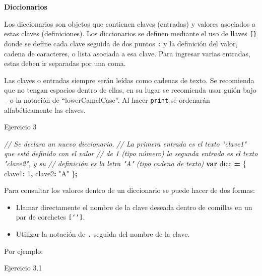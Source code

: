 \documentclass[
  12pt,
  letterpaper,
  twoside]{book}
\newenvironment{Shaded}{\begin{snugshade}}{\end{snugshade}}
\newcommand{\CommentTok}[1]{\textcolor[rgb]{0.56,0.35,0.01}{\textit{#1}}}
\newcommand{\DataTypeTok}[1]{\textcolor[rgb]{0.13,0.29,0.53}{#1}}
\newcommand{\DecValTok}[1]{\textcolor[rgb]{0.00,0.00,0.81}{#1}}
\newcommand{\KeywordTok}[1]{\textcolor[rgb]{0.13,0.29,0.53}{\textbf{#1}}}
\newcommand{\NormalTok}[1]{#1}
\newcommand{\OperatorTok}[1]{\textcolor[rgb]{0.81,0.36,0.00}{\textbf{#1}}}
\newcommand{\StringTok}[1]{\textcolor[rgb]{0.31,0.60,0.02}{#1}}
\providecommand{\tightlist}{%
  \setlength{\itemsep}{0pt}\setlength{\parskip}{0pt}}
\begin{document}
\textbf{Diccionarios}

Los diccionarios son objetos que contienen claves (entradas) y valores asociados a estas claves (definiciones). Los diccionarios se definen mediante el uso de llaves \texttt{\{\}} donde se define cada clave seguida de dos puntos \texttt{:} y la definición del valor, cadena de caracteres, o lista asociada a esa clave. Para ingresar varias entradas, estas deben ir separadas por una coma.

Las claves o entradas siempre serán leídas como cadenas de texto. Se recomienda que no tengan espacios dentro de ellas, en su lugar se recomienda usar guión bajo \texttt{\_} o la notación de ``lowerCamelCase''. Al hacer \texttt{print} se ordenarán alfabéticamente las claves.

Ejercicio 3

\begin{Shaded}
\begin{Highlighting}[]
\CommentTok{// Se declara un nuevo diccionario.}
\CommentTok{// La primera entrada es el texto "clave1" que está definido con el valor}
\CommentTok{// de 1 (tipo número) la segunda entrada es el texto "clave2", y su }
\CommentTok{// definición es la letra "A" (tipo cadena de texto)}
\KeywordTok{var}\NormalTok{ dicc }\OperatorTok{=}\NormalTok{ \{   }
  \DataTypeTok{clave1}\OperatorTok{:} \DecValTok{1}\OperatorTok{,}      
  \DataTypeTok{clave2}\OperatorTok{:} \StringTok{"A"}  
\NormalTok{\}}\OperatorTok{;}            
      
\end{Highlighting}
\end{Shaded}

Para consultar los valores dentro de un diccionario se puede hacer de dos formas:

\begin{itemize}
\tightlist
\item
  Llamar directamente el nombre de la clave deseada dentro de comillas en un par de corchetes \texttt{{[}‘’{]}}.
\item
  Utilizar la notación de \texttt{.} seguida del nombre de la clave.
\end{itemize}

Por ejemplo:

Ejercicio 3.1
\end{document}
